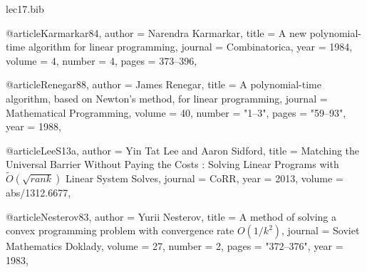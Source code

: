 \documentclass[11pt]{article}
\begin{document}
\begin{filecontents}{lec17.bib}

@article{Karmarkar84,
  author    = {Narendra Karmarkar},
  title     = {A new polynomial-time algorithm for linear programming},
  journal   = {Combinatorica},
  year      = {1984},
  volume    = {4},
  number    = {4},
  pages     = {373--396},
}

@article{Renegar88,
  author = {James Renegar},
  title = {A polynomial-time algorithm, based on {Newton's} method, for linear programming},
  journal = {Mathematical Programming},
  volume = 40,
  number = "1--3",
  pages = "59--93",
  year = 1988,
}

@article{LeeS13a,
  author    = {Yin Tat Lee and
               Aaron Sidford},
  title     = {Matching the Universal Barrier Without Paying the Costs : Solving
               Linear Programs with $\tilde{{O}}(\sqrt{rank})$ Linear System Solves},
  journal   = {CoRR},
  year      = {2013},
  volume    = {abs/1312.6677},
}

@article{Nesterov83,
  author = {Yurii Nesterov},
  title = {A method of solving a convex programming problem with convergence rate ${O}(1/k^2)$},
  journal = {Soviet Mathematics Doklady},
  volume = 27,
  number = 2,
  pages = "372--376",
  year = 1983,
}

\end{filecontents}


\end{document}
